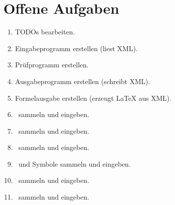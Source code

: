 \section     {Offene Aufgaben}%
\label   {sec-OffeneAufgaben}

\begin{enumerate}
	\item TODOs bearbeiten.
	\item Eingabeprogramm erstellen (liest XML).
	\item Prüfprogramm erstellen.
	\item Ausgabeprogramm erstellen (schreibt XML).
	\item Formelausgabe erstellen (erzeugt \LaTeX{} aus XML).
	\item \Axiome\ sammeln und eingeben.
	\item \Saetze\ sammeln und eingeben.
	\item \Beweise\ sammeln und eingeben.
	\item \Fachbegriffe\ und Symbole sammeln und eingeben.
	\item \Teilgebiete\ sammeln und eingeben.
	\item \Ausgabeschemata\ sammeln und eingeben.
\end{enumerate}

\Endchapter
